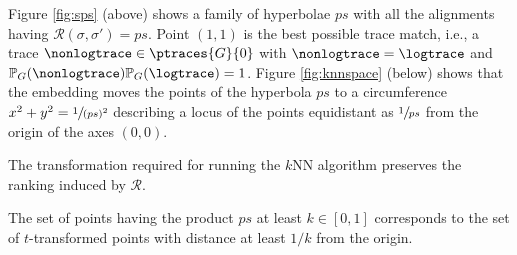 %
\begin{example}
	{Figure \ref{fig:sps} (above) shows a family of hyperbolae $ps$ with all the alignments having 
		$\mathcal{R}(\sigma,\sigma')=ps$. Point $(1,1)$ is the best possible trace match, i.e., a trace 
		$\nonlogtrace\in\ptraces{G}{0}$ with $\nonlogtrace=\logtrace$ and $\mathbb{P}_G(\nonlogtrace)\mathbb{P}_G(\logtrace)=1$.
		Figure \ref{fig:knnspace} (below) shows that the embedding moves the points of the hyperbola $ps$ to a circumference $x^2+y^2=\sfrac{1}{(ps)^2}$ describing a locus of the points equidistant as $\sfrac{1}{ps}$ from the origin of the axes $(0,0)$.}
\end{example}
%
The transformation required for running the $k$NN algorithm preserves the ranking induced by $\mathcal{R}$.

\begin{lemma}
	\label{lem:transfspace}
	The set of points having the product $ps$ at least $k\in[0,1]$ corresponds to the set of $t$-transformed points with distance 
	at least $1/k$ from the origin.
\end{lemma}


